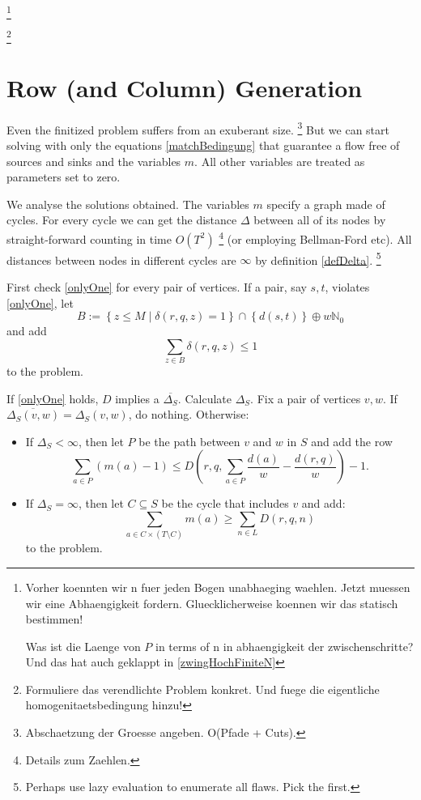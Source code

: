 \documentclass[a4paper]{amsart} %
\newcommand{\ol}[1]{\overline{#1}}
\newcommand{\todo}[1]{\footnote{#1}}
\begin{document}
\todo{Vorher koennten wir n fuer jeden Bogen unabhaeging waehlen.  Jetzt
  muessen wir eine Abhaengigkeit fordern.  Gluecklicherweise koennen wir das statisch
  bestimmen!

  Was ist die Laenge von \(P\) in terms of n in abhaengigkeit der
  zwischenschritte?  Und das hat auch geklappt in \ref{zwingHochFiniteN}}

\todo{Formuliere das verendlichte Problem konkret.  Und fuege die eigentliche homogenitaetsbedingung hinzu!}

\section{Row (and Column) Generation}
Even the finitized problem suffers from an exuberant size.
\todo{Abschaetzung der Groesse angeben.  O(Pfade + Cuts).}  But we can
start solving with only the equations \ref{matchBedingung} that
guarantee a flow free of sources and sinks and the variables \(m\).
All other variables are treated as parameters set to zero.

We analyse the solutions obtained.  The variables \(m\) specify a
graph made of cycles.  For every cycle we can get the distance
\(\Delta\) between all of its nodes by straight-forward counting in
time \(O(T^2)\) \todo{Details zum Zaehlen.} (or employing Bellman-Ford
etc).  All distances between nodes in different cycles are \(\infty\)
by definition \ref{defDelta}.  \todo{Perhaps use lazy evaluation to enumerate
  all flaws.  Pick the first.}

First check \ref{onlyOne} for every pair of vertices.  If a pair, say
\(s,t\), violates \ref{onlyOne}, let \[B := \left\{z\leq M \mid
  \delta(r,q,z) = 1\right\} \cap {\left\{d (s,t)\right\} \oplus w
  \mathbb{N}_0}\] and add
\begin{equation}
  \sum_{z \in B} \delta(r, q, z)  \leq 1
\end{equation}
to the problem.
  

If \ref{onlyOne} holds, \(D\) implies a \(\ol{\Delta_S}\).  Calculate
\(\Delta_S\).  Fix a pair of vertices \(v,w\).  If \(\ol{\Delta_S
  (v,w)} = \Delta_S(v,w)\), do nothing.  Otherwise:
\begin{itemize}
  \item If \(\Delta_S < \infty\), then let \(P\) be the path between \(v\) and \(w\) in \(S\) and add the row
   \begin{equation}
    \sum_{a \in P} (m(a) - 1) \leq D \left(r,q, \sum_{a \in P} \frac{ d \left(a\right)}{w} - \frac{d(r,q)}{w}\right) - 1 \textrm{.}
    \end{equation} 
 \item If \(\Delta_S = \infty\), then let \(C \subseteq S\) be the cycle that includes \(v\) and add:
    \begin{equation}
      \sum_{a \in C \times (T \setminus C)} m(a) \geq \sum_{n \in L} D (r,q, n)
    \end{equation}
    to the problem.
\end{itemize}
\end{document}
